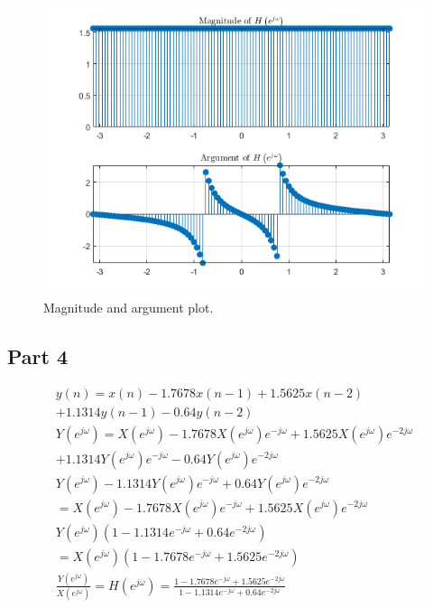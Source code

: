 \documentclass{article}
\begin{document}
\begin{figure}[H]
    \centering
    \includegraphics[width=\textwidth]{"Images/3-17 Part 1"}
    \caption{Magnitude and argument plot.}
    \label{plot:3.17.1}
\end{figure}

\subsection*{Part 4}
\begin{gather*}
    y(n) = x(n)-1.7678x(n-1)+1.5625x(n-2)\\+1.1314y(n-1)-0.64y(n-2)\\
    Y\left( e^{j\omega} \right) = X\left( e^{j\omega} \right) - 1.7678X\left( e^{j\omega} \right)e^{-j\omega} + 1.5625X\left( e^{j\omega} \right)e^{-2j\omega}\\ + 1.1314Y\left( e^{j\omega} \right)e^{-j\omega} - 0.64Y\left( e^{j\omega} \right)e^{-2j\omega}\\
    Y\left( e^{j\omega} \right) - 1.1314Y\left( e^{j\omega} \right)e^{-j\omega} + 0.64Y\left( e^{j\omega} \right)e^{-2j\omega}\\
    = X\left( e^{j\omega} \right) - 1.7678X\left( e^{j\omega} \right)e^{-j\omega} + 1.5625X\left( e^{j\omega} \right)e^{-2j\omega}\\
    Y\left( e^{j\omega} \right) (1 - 1.1314e^{-j\omega} + 0.64e^{-2j\omega}) \\= X\left( e^{j\omega} \right)(1 - 1.7678e^{-j\omega} + 1.5625e^{-2j\omega})\\
    \frac{Y\left( e^{j\omega} \right)}{X\left( e^{j\omega} \right)} = H\left( e^{j\omega} \right) = \frac{1 - 1.7678e^{-j\omega} + 1.5625e^{-2j\omega}}{1 - 1.1314e^{-j\omega} + 0.64e^{-2j\omega}}
\end{gather*}
\end{document}
